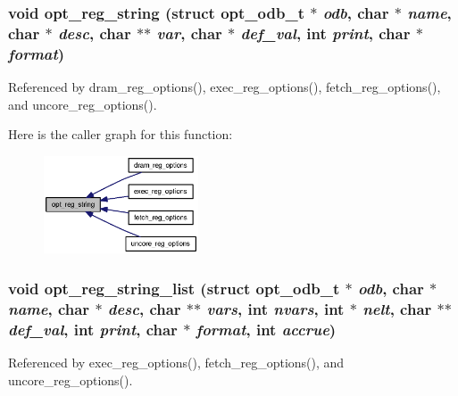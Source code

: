 \subsubsection[{opt\_\-reg\_\-string}]{\setlength{\rightskip}{0pt plus 5cm}void opt\_\-reg\_\-string (struct {\bf opt\_\-odb\_\-t} $\ast$ {\em odb}, \/  char $\ast$ {\em name}, \/  char $\ast$ {\em desc}, \/  char $\ast$$\ast$ {\em var}, \/  char $\ast$ {\em def\_\-val}, \/  int {\em print}, \/  char $\ast$ {\em format})}\label{options_8h_a2015efb5a683bc3f45b63dd94a58b97}




Referenced by dram\_\-reg\_\-options(), exec\_\-reg\_\-options(), fetch\_\-reg\_\-options(), and uncore\_\-reg\_\-options().

Here is the caller graph for this function:\nopagebreak
\begin{figure}[H]
\begin{center}
\leavevmode
\includegraphics[width=130pt]{options_8h_a2015efb5a683bc3f45b63dd94a58b97_icgraph}
\end{center}
\end{figure}
\subsubsection[{opt\_\-reg\_\-string\_\-list}]{\setlength{\rightskip}{0pt plus 5cm}void opt\_\-reg\_\-string\_\-list (struct {\bf opt\_\-odb\_\-t} $\ast$ {\em odb}, \/  char $\ast$ {\em name}, \/  char $\ast$ {\em desc}, \/  char $\ast$$\ast$ {\em vars}, \/  int {\em nvars}, \/  int $\ast$ {\em nelt}, \/  char $\ast$$\ast$ {\em def\_\-val}, \/  int {\em print}, \/  char $\ast$ {\em format}, \/  int {\em accrue})}\label{options_8h_752ea4c2b38f9ed0bb1126b7b23ac869}




Referenced by exec\_\-reg\_\-options(), fetch\_\-reg\_\-options(), and uncore\_\-reg\_\-options().

